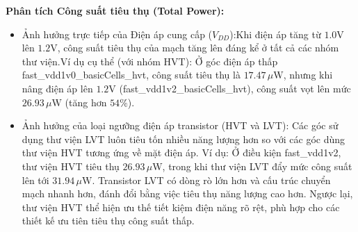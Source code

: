 \documentclass[12pt,a4paper,oneside]{book}
\begin{document}
\textbf{Phân tích Công suất tiêu thụ (Total Power):}
\begin{itemize}
    \item Ảnh hưởng trực tiếp của Điện áp cung cấp ($V_{DD}$):Khi điện áp tăng từ $1.0\text{V}$ lên $1.2\text{V}$, công suất tiêu thụ của mạch tăng lên đáng kể ở tất cả các nhóm thư viện.Ví dụ cụ thể (với nhóm HVT): Ở góc điện áp thấp fast\_vdd1v0\_basicCells\_hvt, công suất tiêu thụ là $17.47\,\mu\text{W}$, nhưng khi nâng điện áp lên $1.2\text{V}$ (fast\_vdd1v2\_basicCells\_hvt), công suất vọt lên mức $26.93\,\mu\text{W}$ (tăng hơn $54\%$).
    \item Ảnh hưởng của loại ngưỡng điện áp transistor (HVT và LVT): Các góc sử dụng thư viện LVT luôn tiêu tốn nhiều năng lượng hơn so với các góc dùng thư viện HVT tương ứng về mặt điện áp. Ví dụ: Ở điều kiện fast\_vdd1v2, thư viện HVT tiêu thụ $26.93\,\mu\text{W}$, trong khi thư viện LVT đẩy mức công suất lên tới $31.94\,\mu\text{W}$. Transistor LVT có dòng rò lớn hơn và cấu trúc chuyển mạch nhanh hơn, đánh đổi bằng việc tiêu thụ năng lượng cao hơn. Ngược lại, thư viện HVT thể hiện ưu thế tiết kiệm điện năng rõ rệt, phù hợp cho các thiết kế ưu tiên tiêu thụ công suất thấp.
\end{itemize}
\end{document}

